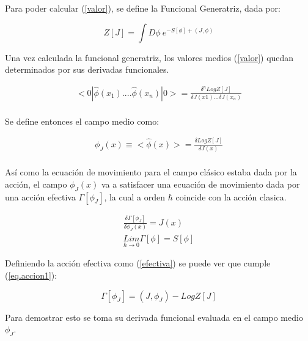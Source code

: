 Para poder calcular (\ref{valor}), se define la Funcional Generatriz, dada por:

\begin{equation}
Z [J] = 
\int D \phi \ e ^{- S[ \phi ] + (J, \phi )}
\label{eq.generatriz}
\end{equation}

Una vez calculada la funcional generatriz, los valores medios (\ref{valor}) quedan determinados por sus derivadas funcionales.

\begin{equation}
\begin{array}{c}
< 0 | \hat{ \phi  } (x _1) .... \hat{\phi  } (x _n) | 0 > = 
\frac{\delta ^n Log Z[J] }{ \delta J(x1) ... \delta J(x _n) } \\[10pt]
\end{array}
\end{equation}


Se define entonces el campo medio como:

\begin{equation}
\begin{array}{c}
\phi _J (x) \equiv < \hat{\phi } (x) > = \frac{\delta Log Z[J] }{\delta J(x)}  \\[10pt]
\end{array}
\end{equation}



Así como la ecuación de movimiento para el campo clásico estaba dada por la acción, el campo $ \phi _J (x) $ va a satisfacer una ecuación de movimiento dada por una acción efectiva $ \Gamma [\phi _J] $, la cual a orden $\hbar$ coincide con la acción clasica.


\begin{equation}
\begin{array}{c}
\frac{\delta \Gamma [ \phi _J ]  }{\delta \phi _J (x)  } = 
J (x) \\[8pt]
\underset{ \hbar \rightarrow 0 }{ Lim  } \Gamma [ \phi  ] = S [ \phi ]
\end{array}
\label{eq.accion1}
\end{equation}

Definiendo la acción efectiva como (\ref{efectiva}) se puede ver que cumple (\ref{eq.accion1}):

\begin{equation}
\Gamma [\phi _J] = (J, \phi _J) - Log Z [J]
\label{efectiva}
\end{equation}

Para demostrar esto se toma su derivada funcional evaluada en el campo medio $\phi _J $.


